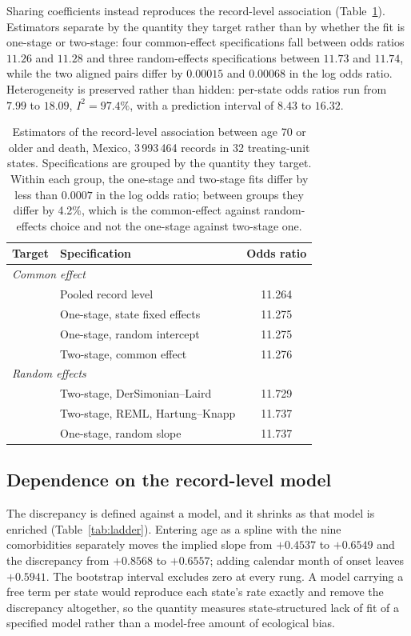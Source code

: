 \documentclass[11pt]{article}
\begin{document}
Sharing coefficients instead reproduces the record-level association
(Table~\ref{tab:estimators}).  Estimators separate by the quantity they
target rather than by whether the fit is one-stage or two-stage: four
common-effect specifications fall between odds ratios $11.26$ and
$11.28$ and three random-effects specifications between $11.73$ and
$11.74$, while the two aligned pairs differ by $0.00015$ and $0.00068$
in the log odds ratio.  Heterogeneity is preserved rather than hidden: per-state
odds ratios run from $7.99$ to $18.09$, $I^2 = 97.4\%$, with a
prediction interval of $8.43$ to $16.32$.

\begin{table}[t]
\centering
\caption{Estimators of the record-level association between age 70 or
older and death, Mexico, 3\,993\,464 records in 32 treating-unit states.
Specifications are grouped by the quantity they target.  Within each
group, the one-stage and two-stage fits differ by less than $0.0007$ in
the log odds ratio; between groups they differ by 4.2\%, which is the
common-effect against random-effects choice and not the one-stage
against two-stage one.}
\label{tab:estimators}
\begin{tabular}{llc}
\toprule
Target & Specification & Odds ratio \\
\midrule
\multicolumn{3}{l}{\emph{Common effect}} \\
& Pooled record level                  & 11.264 \\
& One-stage, state fixed effects       & 11.275 \\
& One-stage, random intercept          & 11.275 \\
& Two-stage, common effect             & 11.276 \\
\midrule
\multicolumn{3}{l}{\emph{Random effects}} \\
& Two-stage, DerSimonian--Laird        & 11.729 \\
& Two-stage, REML, Hartung--Knapp      & 11.737 \\
& One-stage, random slope              & 11.737 \\
\bottomrule
\end{tabular}
\end{table}

\subsection{Dependence on the record-level model}

The discrepancy is defined against a model, and it shrinks as that model
is enriched (Table~\ref{tab:ladder}).  Entering age as a spline with the
nine comorbidities separately moves the implied slope from $+0.4537$ to
$+0.6549$ and the discrepancy from $+0.8568$ to $+0.6557$; adding
calendar month of onset leaves $+0.5941$.  The bootstrap interval
excludes zero at every rung.  A model carrying a free term per state
would reproduce each state's rate exactly and remove the discrepancy
altogether, so the quantity measures state-structured lack of fit of a
specified model rather than a model-free amount of ecological bias.
\end{document}
